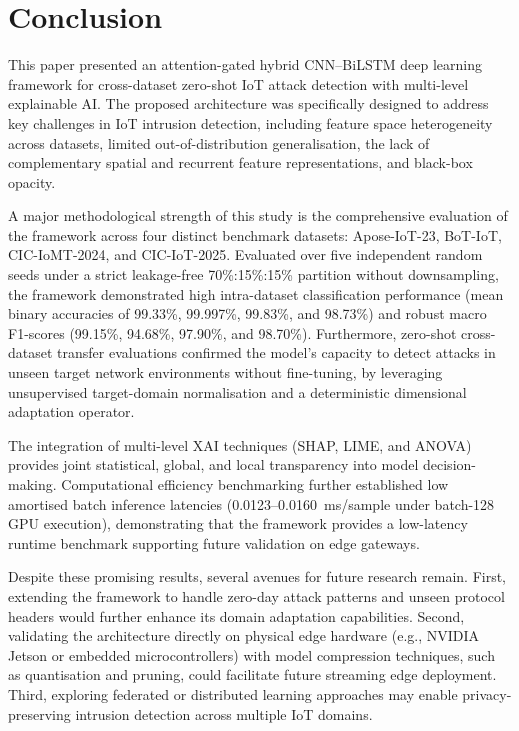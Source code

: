 \documentclass[a4paper,fleqn]{cas-sc}
\begin{document}
\section{Conclusion}
\label{sec:conclusion}
{\color{blue}This paper presented an attention-gated hybrid CNN--BiLSTM deep learning framework for cross-dataset zero-shot IoT attack detection with multi-level explainable AI. The proposed architecture was specifically designed to address key challenges in IoT intrusion detection, including feature space heterogeneity across datasets, limited out-of-distribution generalisation, the lack of complementary spatial and recurrent feature representations, and black-box opacity.}

A major methodological strength of this study is the comprehensive evaluation of the framework across four distinct benchmark datasets: Apose-IoT-23, BoT-IoT, CIC-IoMT-2024, and CIC-IoT-2025. Evaluated over five independent random seeds under a strict leakage-free 70\%:15\%:15\% partition without downsampling, the framework demonstrated high intra-dataset classification performance (mean binary accuracies of 99.33\%, 99.997\%, 99.83\%, and 98.73\%) and robust macro F1-scores (99.15\%, 94.68\%, 97.90\%, and 98.70\%). Furthermore, zero-shot cross-dataset transfer evaluations confirmed the model's capacity to detect attacks in unseen target network environments without fine-tuning, by leveraging unsupervised target-domain normalisation and a deterministic dimensional adaptation operator.

{\color{blue}The integration of multi-level XAI techniques (SHAP, LIME, and ANOVA) provides joint statistical, global, and local transparency into model decision-making. Computational efficiency benchmarking further established low amortised batch inference latencies (0.0123--0.0160~ms/sample under batch-128 GPU execution), demonstrating that the framework provides a low-latency runtime benchmark supporting future validation on edge gateways.}

{\color{blue}Despite these promising results, several avenues for future research remain. First, extending the framework to handle zero-day attack patterns and unseen protocol headers would further enhance its domain adaptation capabilities. Second, validating the architecture directly on physical edge hardware (e.g., NVIDIA Jetson or embedded microcontrollers) with model compression techniques, such as quantisation and pruning, could facilitate future streaming edge deployment. Third, exploring federated or distributed learning approaches may enable privacy-preserving intrusion detection across multiple IoT domains.}
\end{document}
